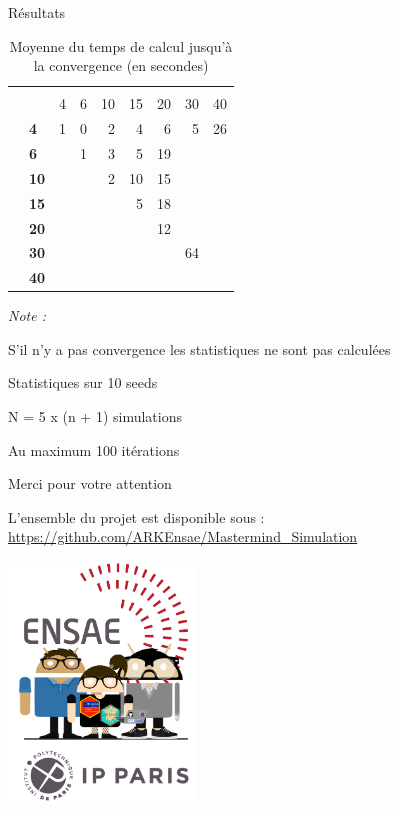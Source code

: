 \documentclass[10pt,xcolor=table,color={dvipsnames,usenames},ignorenonframetext,usepdftitle=false,french]{beamer}
\begin{document}
\begin{frame}{Résultats}
\protect\hypertarget{ruxe9sultats-11}{}

\begin{table}

\caption{\label{tab:tabq3tempsconv}Moyenne du temps de calcul jusqu'à la convergence (en secondes)}
\centering
\begin{threeparttable}
\begin{tabular}[t]{>{\bfseries}l|>{\bfseries}l|r|r|r|r|r|r|r}
\hline
\multicolumn{2}{c|}{ } & \multicolumn{7}{c}{m} \\
\cline{3-9}
  &    & 4 & 6 & 10 & 15 & 20 & 30 & 40\\
\hline
 & 4 & 1 & 0 & 2 & 4 & 6 & 5 & 26\\
\cline{2-9}
 & 6 &  & 1 & 3 & 5 & 19 &  & \\
\cline{2-9}
 & 10 &  &  & 2 & 10 & 15 &  & \\
\cline{2-9}
 & 15 &  &  &  & 5 & 18 &  & \\
\cline{2-9}
 & 20 &  &  &  &  & 12 &  & \\
\cline{2-9}
 & 30 &  &  &  &  &  & 64 & \\
\cline{2-9}
\multirow{-7}{*}{\raggedright\arraybackslash n} & 40 &  &  &  &  &  &  & \\
\hline
\end{tabular}
\begin{tablenotes}
\item \textit{Note : } 
\item S'il n'y a pas convergence les statistiques ne sont pas calculées
\item Statistiques sur 10 seeds
\item N = 5 x (n + 1) simulations
\item Au maximum 100 itérations
\end{tablenotes}
\end{threeparttable}
\end{table}

\end{frame}

\begin{frame}{Merci pour votre attention}
\protect\hypertarget{merci-pour-votre-attention}{}

L'ensemble du projet est disponible sous :
\url{https://github.com/ARKEnsae/Mastermind_Simulation}

\begin{center}
\includegraphics[width = 5cm]{img/LOGO-ENSAE.png}
\end{center}

\end{frame}
\end{document}
